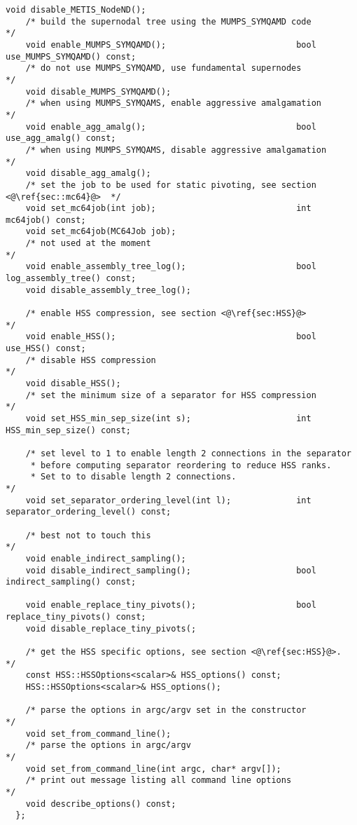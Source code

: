 \documentclass{article}
\begin{document}
\begin{lstlisting}[style=C]
    void disable_METIS_NodeND();
    /* build the supernodal tree using the MUMPS_SYMQAMD code        */
    void enable_MUMPS_SYMQAMD();                          bool use_MUMPS_SYMQAMD() const;
    /* do not use MUMPS_SYMQAMD, use fundamental supernodes          */
    void disable_MUMPS_SYMQAMD();
    /* when using MUMPS_SYMQAMS, enable aggressive amalgamation      */
    void enable_agg_amalg();                              bool use_agg_amalg() const;
    /* when using MUMPS_SYMQAMS, disable aggressive amalgamation      */
    void disable_agg_amalg();
    /* set the job to be used for static pivoting, see section <@\ref{sec::mc64}@>  */
    void set_mc64job(int job);                            int mc64job() const;
    void set_mc64job(MC64Job job);
    /* not used at the moment                                         */
    void enable_assembly_tree_log();                      bool log_assembly_tree() const;
    void disable_assembly_tree_log();

    /* enable HSS compression, see section <@\ref{sec:HSS}@>                          */
    void enable_HSS();                                    bool use_HSS() const;
    /* disable HSS compression                                        */
    void disable_HSS();
    /* set the minimum size of a separator for HSS compression        */
    void set_HSS_min_sep_size(int s);                     int HSS_min_sep_size() const;

    /* set level to 1 to enable length 2 connections in the separator
     * before computing separator reordering to reduce HSS ranks.
     * Set to to disable length 2 connections.                        */
    void set_separator_ordering_level(int l);             int separator_ordering_level() const;

    /* best not to touch this                                         */
    void enable_indirect_sampling();
    void disable_indirect_sampling();                     bool indirect_sampling() const;

    void enable_replace_tiny_pivots();                    bool replace_tiny_pivots() const;
    void disable_replace_tiny_pivots(;

    /* get the HSS specific options, see section <@\ref{sec:HSS}@>.                   */
    const HSS::HSSOptions<scalar>& HSS_options() const;
    HSS::HSSOptions<scalar>& HSS_options();

    /* parse the options in argc/argv set in the constructor          */
    void set_from_command_line();
    /* parse the options in argc/argv                                 */
    void set_from_command_line(int argc, char* argv[]);
    /* print out message listing all command line options             */
    void describe_options() const;
  };
\end{lstlisting}
\end{document}
